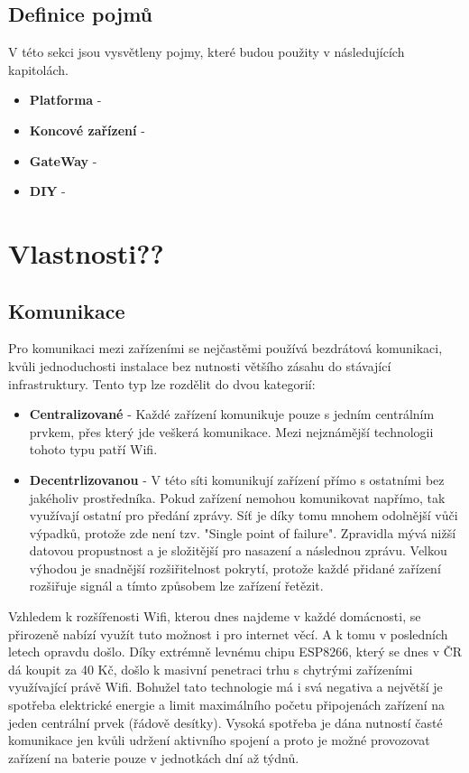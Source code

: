 \documentclass[thesis=B,czech]{FITthesis}[2019/12/23]
\begin{document}
\subsection{Definice pojmů}
V této sekci jsou vysvětleny pojmy, které budou použity v následujících kapitolách.

\begin{itemize}
    \item \textbf{Platforma} -
    \item \textbf{Koncové zařízení} -
    \item \textbf{GateWay} -
    \item \textbf{DIY} -
\end{itemize}

\section{Vlastnosti??}

\subsection{Komunikace}    %
Pro komunikaci mezi zařízeními se nejčastěmi používá bezdrátová komunikaci, kvůli jednoduchosti instalace bez nutnosti většího zásahu do stávající infrastruktury. Tento typ lze rozdělit do dvou kategorií:
\begin{itemize}
    \item \textbf{Centralizované} - Každé zařízení komunikuje pouze s jedním centrálním prvkem, přes který jde veškerá komunikace. Mezi nejznámější technologii tohoto typu patří Wifi.
    \item \textbf{Decentrlizovanou} - V této síti komunikují zařízení přímo s ostatními bez jakéholiv prostředníka. Pokud zařízení nemohou komunikovat napřímo, tak využívají ostatní pro předání zprávy. Síť je díky tomu mnohem odolnější vůči výpadků, protože zde není tzv. "Single point of failure". Zpravidla mývá nižší datovou propustnost a je složitější pro nasazení a následnou zprávu. Velkou výhodou je snadnější rozšiřitelnost pokrytí, protože každé přidané zařízení rozšiřuje signál a tímto způsobem lze zařízení řetězit.
\end{itemize}
Vzhledem k rozšířenosti Wifi, kterou dnes najdeme v každé domácnosti, se přirozeně nabízí využít tuto možnost i pro internet věcí. A k tomu v posledních letech opravdu došlo. Díky extrémně levnému chipu ESP8266, který se dnes v ČR dá koupit za 40 Kč, došlo k masivní penetraci trhu s chytrými zařízeními využívající právě Wifi. Bohužel tato technologie má i svá negativa a největší je spotřeba elektrické energie a limit maximálního početu připojenách zařízení na jeden centrální prvek (řádově desítky). Vysoká spotřeba je dána nutností časté komunikace jen kvůli udržení aktivního spojení a proto je možné provozovat zařízení na baterie pouze v jednotkách dní až týdnů.
\end{document}
